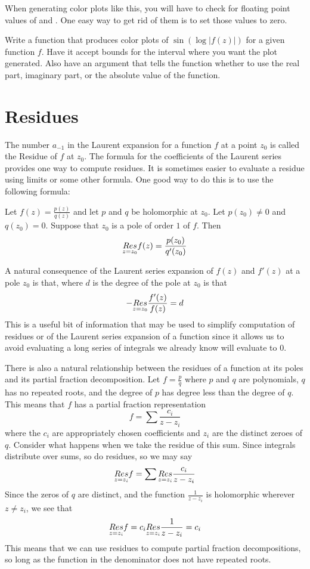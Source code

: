 \begin{warn}
When generating color plots like this, you will have to check for floating point values of  and .
One easy way to get rid of them is to set those values to zero.
\end{warn}

\begin{problem}
Write a function that produces color plots of $\sin\left(\log\left|f\left(z\right)\right|\right)$ for a given function $f$.
Have it accept bounds for the interval where you want the plot generated.
Also have an argument that tells the function whether to use the real part, imaginary part, or the absolute value of the function.
\end{problem}

\section*{Residues}
The number $a_{-1}$ in the Laurent expansion for a function $f$ at a point $z_0$ is called the Residue of $f$ at $z_0$.
The formula for the coefficients of the Laurent series provides one way to compute residues.
It is sometimes easier to evaluate a residue using limits or some other formula.
One good way to do this is to use the following formula:

Let $f(z)=\frac{p(z)}{q(z)}$ and let $p$ and $q$ be holomorphic at $z_0$. Let $p(z_0) \neq 0$ and $q(z_0)=0$.
Suppose that $z_0$ is a pole of order $1$ of $f$.
Then
\[\underset{z=z_0}{Res} f(z) = \frac{p(z_0)}{q'(z_0)}\]

A natural consequence of the Laurent series expansion of $f(z)$ and $f'(z)$ at a pole $z_0$ is that, where $d$ is the degree of the pole at $z_0$ is that
\[- \underset{z=z_0}{Res} \frac{f'(z)}{f(z)} = d\]
This is a useful bit of information that may be used to simplify computation of residues or of the Laurent series expansion of a function since it allows us to avoid evaluating a long series of integrals we already know will evaluate to $0$.

There is also a natural relationship between the residues of a function at its poles and its partial fraction decomposition.
Let $f = \frac{p}{q}$ where $p$ and $q$ are polynomials, $q$ has no repeated roots, and the degree of $p$ has degree less than the degree of $q$.
This means that $f$ has a partial fraction representation
\[f = \sum \frac{c_i}{z - z_i}\]
where the $c_i$ are appropriately chosen coefficients and $z_i$ are the distinct zeroes of $q$.
Consider what happens when we take the residue of this sum.
Since integrals distribute over sums, so do residues, so we may say
\[\underset{z=z_i}{Res} f = \sum \underset{z=z_i}{Res} \frac{c_i}{z - z_i}\]
Since the zeros of $q$ are distinct, and the function $\frac{1}{z - z_i}$ is holomorphic wherever $z \neq z_i$, we see that
\[\underset{z=z_i}{Res} f = c_i \underset{z=z_i}{Res} \frac{1}{z-z_i} = c_i\]
This means that we can use residues to compute partial fraction decompositions, so long as the function in the denominator does not have repeated roots.

